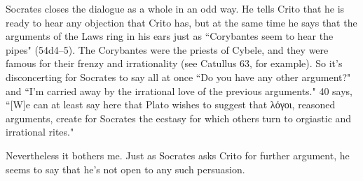 \documentclass[12pt,letterpaper]{article}
\begin{document}
Socrates closes the dialogue as a whole in an odd way. He tells Crito that he is ready to hear any objection that Crito has, but at the same time he says that the arguments of the Laws ring in his ears just as ``Corybantes seem to hear the pipes" (54d4--5). The Corybantes were the priests of Cybele, and they were famous for their frenzy and irrationality (see Catullus 63, for example). So it's disconcerting for Socrates to say all at once ``Do you have any other argument?" and ``I'm carried away by the irrational love of the previous arguments." \cite{rose1983} 40 says, ``[W]e can at least say here that Plato wishes to suggest that \textgreek{λόγοι}, reasoned arguments, create for Socrates the ecstasy for which others turn to orgiastic and irrational rites."

Nevertheless it bothers me. Just as Socrates asks Crito for further argument, he seems to say that he's not open to any such persuasion.

\newpage
\pagestyle{references}
\nocite{burnet1903}
\printbibliography[filter=sources,title={Ancient Sources: Editions, Translations, Commentaries}]
\printbibliography[filter=secondary,title=Secondary Literature]
\end{document}

